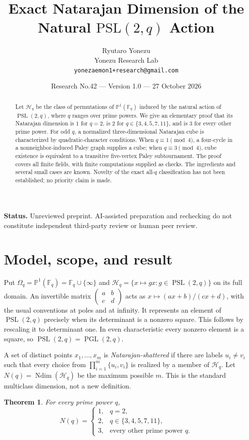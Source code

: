 \documentclass[11pt,a4paper]{article}
\title{\vspace{-12mm}\Large\bfseries Exact Natarajan Dimension of the\protect\\ Natural $\mathrm{PSL}(2,q)$ Action}
\author{Ryutaro Yonezu\\\small Yonezu Research Lab\\\small\texttt{yonezaemon1+research@gmail.com}}
\date{\small Research No.42 --- Version 1.0 --- 27 October 2026}
\newtheorem{theorem}{Theorem}
\DeclareMathOperator{\PSL}{PSL}
\DeclareMathOperator{\PGL}{PGL}
\DeclareMathOperator{\Ndim}{Ndim}
\newcommand{\F}{\mathbb{F}}
\newcommand{\PP}{\mathbb{P}}
\begin{document}
\maketitle
\thispagestyle{plain}
\begin{abstract}
Let $\mathcal H_q$ be the class of permutations of $\PP^1(\F_q)$ induced by
the natural action of $\PSL(2,q)$, where $q$ ranges over prime powers. We give
an elementary proof that its Natarajan dimension is $1$ for $q=2$, is $2$
for $q\in\{3,4,5,7,11\}$, and is $3$ for every other prime power.
For odd $q$, a normalized three-dimensional Natarajan cube is characterized
by quadratic-character conditions. When $q\equiv1\pmod4$, a four-cycle in
a nonneighbor-induced Paley graph supplies a cube; when $q\equiv3\pmod4$,
cube existence is equivalent to a transitive five-vertex Paley subtournament.
The proof covers all finite fields, with finite computations supplied as
checks. The ingredients and several small cases are known. Novelty of the
exact all-$q$ classification has not been established; no priority claim is made.
\end{abstract}
\noindent\textbf{Status.} Unreviewed preprint. AI-assisted preparation and rechecking do not
constitute independent third-party review or human peer review.

\section{Model, scope, and result}
Put $\Omega_q=\PP^1(\F_q)=\F_q\cup\{\infty\}$ and
$\mathcal H_q=\{x\mapsto gx:g\in\PSL(2,q)\}$ on its full domain.
An invertible matrix $\begin{pmatrix}a&b\\c&d\end{pmatrix}$ acts as
$x\mapsto (ax+b)/(cx+d)$, with the usual conventions at poles and at infinity.
It represents an element of $\PSL(2,q)$ precisely when its determinant is a
nonzero square. This follows by rescaling it to determinant one. In even
characteristic every nonzero element is a square, so $\PSL(2,q)=\PGL(2,q)$.

A set of distinct points $x_1,\ldots,x_m$ is \emph{Natarajan-shattered} if
there are labels $u_i\ne v_i$ such that every choice from
$\prod_{i=1}^m\{u_i,v_i\}$ is realized by a member of $\mathcal H_q$.
Let $N(q)=\Ndim(\mathcal H_q)$ be the maximum possible $m$.
This is the standard multiclass dimension, not a new definition.

\begin{theorem}\label{thm:main}
For every prime power $q$,
\[
N(q)=\begin{cases}
1,&q=2,\\
2,&q\in\{3,4,5,7,11\},\\
3,&\text{every other prime power }q.
\end{cases}
\]
\end{theorem}
\end{document}
